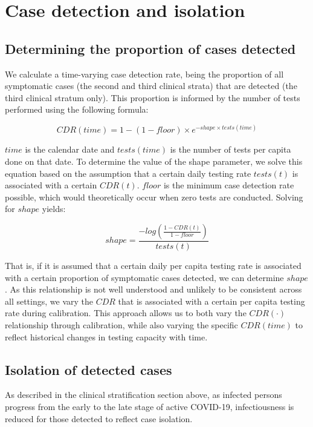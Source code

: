 \section{Case detection and isolation} \label{cdr}

\subsection{Determining the proportion of cases detected}
We calculate a time-varying case detection rate, being the proportion of all symptomatic cases (the second and third clinical strata) that are detected (the third clinical stratum only).
This proportion is informed by the number of tests performed using the following formula:

\[CDR(time)=1-(1-floor)\times e^{-shape \times tests(time)}\]

$time$ is the calendar date and $tests(time)$ is the number of tests per capita done on that date. To determine the value of the shape parameter, we solve this equation based on the assumption that a certain daily testing rate $tests(t)$ is associated with a certain $CDR(t)$.
$floor$ is the minimum case detection rate possible, which would theoretically occur when zero tests are conducted.
Solving for $shape$ yields:

\[shape = \frac{-log(\frac{1 - CDR(t)}{1 - floor})}{tests(t)}\]

That is, if it is assumed that a certain daily per capita testing rate is associated with a certain proportion of symptomatic cases detected, we can determine $shape$.
As this relationship is not well understood and unlikely to be consistent across all settings, we vary the $CDR$ that is associated with a certain per capita testing rate during calibration.
This approach allows us to both vary the $CDR(\cdot)$ relationship through calibration,
while also varying the specific $CDR(time)$ to reflect historical changes in testing capacity with time.

\subsection{Isolation of detected cases}
As described in the clinical stratification section above, as infected persons progress from the early to the late stage of active COVID-19, infectiousness is reduced for those detected to reflect case isolation.
